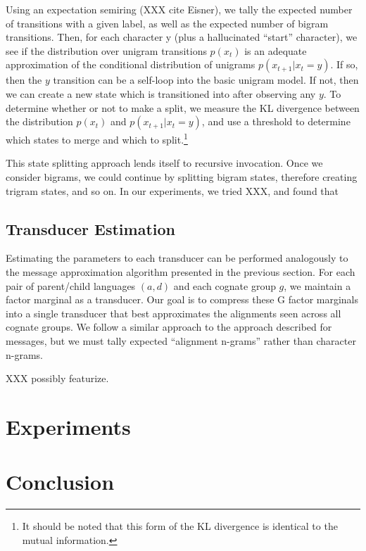 \documentclass[11pt]{article}
\begin{document}
Using an expectation semiring (XXX cite Eisner), we tally the
expected number of transitions with a given label, as well as the
expected number of bigram transitions. Then, for each character y
(plus a hallucinated ``start'' character), we see if the distribution
over unigram transitions $p(x_t)$ is an adequate approximation of
the conditional distribution of unigrams $p(x_{t+1}|x_t = y)$. If
so, then the $y$ transition can be a self-loop into the basic unigram
model. If not, then we can create a new state which is transitioned
into after observing any $y$. To determine whether or not to make
a split, we measure the KL divergence between the distribution
$p(x_t)$ and $p(x_{t+1}|x_t=y)$, and use a threshold to determine
which states to merge and which to split.\footnote{It should be
noted that this form of the KL divergence is identical to the mutual
information.}

This state splitting approach lends itself to recursive invocation.
Once we consider bigrams, we could continue by splitting bigram
states, therefore creating trigram states, and so on. In our experiments,
we tried XXX, and found that 

\subsection{Transducer Estimation}

Estimating the parameters to each transducer can be performed
analogously to the message approximation algorithm presented in the
previous section. For each pair of parent/child languages $(a,d)$
and each cognate group $g$, we maintain a factor marginal as a
transducer. Our goal is to compress these G factor marginals into
a single transducer that best approximates the alignments seen
across all cognate groups. We follow a similar approach to the
approach described for messages, but we must tally expected ``alignment
n-grams'' rather than character n-grams.

XXX possibly featurize.

\section{Experiments}
\section{Conclusion}
\end{document}
